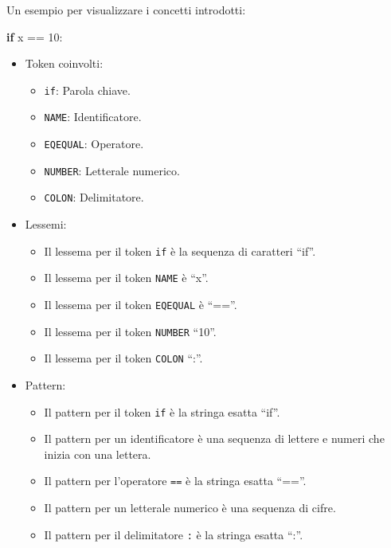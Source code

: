 \documentclass[
  letterpaper,
]{scrbook}
\newenvironment{Shaded}{\begin{snugshade}}{\end{snugshade}}
\newcommand{\ControlFlowTok}[1]{\textcolor[rgb]{0.00,0.23,0.31}{\textbf{#1}}}
\newcommand{\DecValTok}[1]{\textcolor[rgb]{0.68,0.00,0.00}{#1}}
\newcommand{\NormalTok}[1]{\textcolor[rgb]{0.00,0.23,0.31}{#1}}
\newcommand{\OperatorTok}[1]{\textcolor[rgb]{0.37,0.37,0.37}{#1}}
\providecommand{\tightlist}{%
  \setlength{\itemsep}{0pt}\setlength{\parskip}{0pt}}\usepackage{longtable,booktabs,array}
\begin{document}
Un esempio per visualizzare i concetti introdotti:

\begin{Shaded}
\begin{Highlighting}[]
\ControlFlowTok{if}\NormalTok{ x }\OperatorTok{==} \DecValTok{10}\NormalTok{:}
\end{Highlighting}
\end{Shaded}

\begin{itemize}
\item
  Token coinvolti:

  \begin{itemize}
  \tightlist
  \item
    \texttt{if}: Parola chiave.
  \item
    \texttt{NAME}: Identificatore.
  \item
    \texttt{EQEQUAL}: Operatore.
  \item
    \texttt{NUMBER}: Letterale numerico.
  \item
    \texttt{COLON}: Delimitatore.
  \end{itemize}
\item
  Lessemi:

  \begin{itemize}
  \tightlist
  \item
    Il lessema per il token \texttt{if} è la sequenza di caratteri
    ``if''.
  \item
    Il lessema per il token \texttt{NAME} è ``x''.
  \item
    Il lessema per il token \texttt{EQEQUAL} è ``==''.
  \item
    Il lessema per il token \texttt{NUMBER} ``10''.
  \item
    Il lessema per il token \texttt{COLON} ``:''.
  \end{itemize}
\item
  Pattern:

  \begin{itemize}
  \tightlist
  \item
    Il pattern per il token \texttt{if} è la stringa esatta ``if''.
  \item
    Il pattern per un identificatore è una sequenza di lettere e numeri
    che inizia con una lettera.
  \item
    Il pattern per l'operatore \texttt{==} è la stringa esatta ``==''.
  \item
    Il pattern per un letterale numerico è una sequenza di cifre.
  \item
    Il pattern per il delimitatore \texttt{:} è la stringa esatta ``:''.
  \end{itemize}
\end{itemize}
\end{document}

